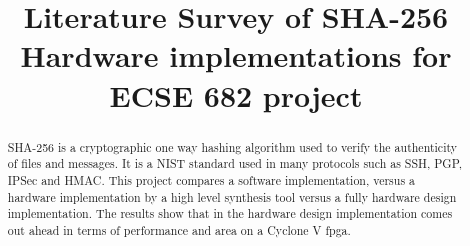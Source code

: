 \documentclass[conference]{IEEEtran}
\begin{document}
%
\title{Literature Survey of SHA-256 Hardware implementations for ECSE 682 project}


\author{
}

\maketitle

\begin{abstract}
SHA-256 is a cryptographic one way hashing algorithm used to verify the authenticity of files and messages. It is a NIST standard used in many protocols such as SSH, PGP, IPSec and HMAC. This project compares a software implementation, versus a hardware implementation by a high level synthesis tool versus a fully hardware design implementation. The results show that in the hardware design implementation comes out ahead in terms of performance and area on a Cyclone V fpga. 
\end{abstract}

\IEEEpeerreviewmaketitle
\end{document}
